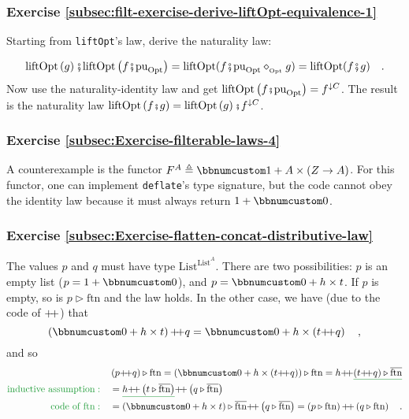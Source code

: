 \subsubsection*{Exercise \ref{subsec:filt-exercise-derive-liftOpt-equivalence-1}}

Starting from \lstinline!liftOpt!\textsf{'}s law, derive the naturality law:

\[
\text{liftOpt}\left(g\right)\bef\text{liftOpt}\left(f\bef\text{pu}_{\text{Opt}}\right)=\text{liftOpt}(f\bef\text{pu}_{\text{Opt}}\diamond_{_{\text{Opt}}}g)=\text{liftOpt}(f\bef g)\quad.
\]
Now use the naturality-identity law and get $\text{liftOpt}\left(f\bef\text{pu}_{\text{Opt}}\right)=f^{\downarrow C}$.
The result is the naturality law $\text{liftOpt}\left(f\bef g\right)=\text{liftOpt}\left(g\right)\bef f^{\downarrow C}$.

\subsubsection*{Exercise \ref{subsec:Exercise-filterable-laws-4}}

A counterexample is the functor $F^{A}\triangleq\bbnum 1+A\times\left(Z\rightarrow A\right)$.
For this functor, one can implement \lstinline!deflate!\textsf{'}s type signature,
but the code cannot obey the identity law because it must always return
$1+\bbnum 0$.

\subsubsection*{Exercise \ref{subsec:Exercise-flatten-concat-distributive-law}}

The values $p$ and $q$ must have type $\text{List}^{\text{List}^{A}}$.
There are two possibilities: $p$ is an empty list ($p=1+\bbnum 0$),
and $p=\bbnum 0+h\times t$. If $p$ is empty, so is $p\triangleright\text{ftn}$
and the law holds. In the other case, we have (due to the code of
${\displaystyle }{+\negmedspace+}$) that
\[
\left(\bbnum 0+h\times t\right)\pplus q=\bbnum 0+h\times\left(t\pplus q\right)\quad,
\]
and so
\begin{align*}
 & \left(p\pplus q\right)\triangleright\text{ftn}=\left(\bbnum 0+h\times\left(t\pplus q\right)\right)\triangleright\text{ftn}=h\pplus\gunderline{\left(t\pplus q\right)\triangleright\overline{\text{ftn}}}\\
{\color{greenunder}\text{inductive assumption}:}\quad & =\gunderline{h\pplus\left(t\triangleright\overline{\text{ftn}}\right)}\pplus\left(q\triangleright\overline{\text{ftn}}\right)\\
{\color{greenunder}\text{code of }\text{ftn}:}\quad & =\left(\bbnum 0+h\times t\right)\triangleright\overline{\text{ftn}}\pplus\left(q\triangleright\overline{\text{ftn}}\right)=\left(p\triangleright\text{ftn}\right)\pplus\left(q\triangleright\text{ftn}\right)\quad.
\end{align*}


